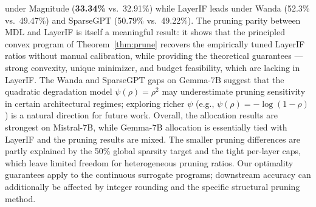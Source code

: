 \documentclass[accepted]{uai2026}%
\theoremstyle{remark}%
\begin{document}
under Magnitude (\textbf{33.34\%} vs.\ 32.91\%) while LayerIF
leads under Wanda (52.3\% vs.\ 49.47\%) and SparseGPT
(50.79\% vs.\ 49.22\%).
The pruning parity between MDL and LayerIF is itself a meaningful
result: it shows that the principled convex program of
Theorem~\ref{thm:prune} recovers the empirically tuned LayerIF ratios
without manual calibration, while providing the theoretical
guarantees --- strong convexity, unique minimizer, and budget feasibility, which are lacking in LayerIF.
The Wanda and SparseGPT gaps on Gemma-7B suggest that the quadratic
degradation model $\psi(\rho) = \rho^2$ may underestimate pruning
sensitivity in certain architectural regimes;
exploring richer $\psi$ (e.g., $\psi(\rho) = -\log(1-\rho)$)
is a natural direction for future work. Overall, the allocation results are strongest on Mistral-7B, while
Gemma-7B allocation is essentially tied with LayerIF and the pruning
results are mixed. The smaller pruning differences are partly explained
by the 50\% global sparsity target and the tight per-layer caps, which
leave limited freedom for heterogeneous pruning ratios. Our optimality
guarantees apply to the continuous surrogate programs; downstream
accuracy can additionally be affected by integer rounding and the
specific structural pruning method.

\end{document}
